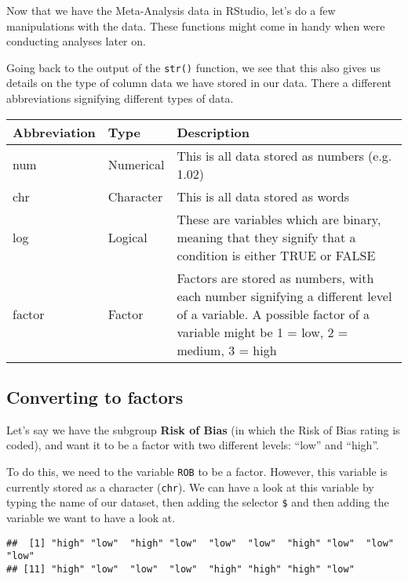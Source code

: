 \documentclass[]{book}
\newenvironment{Shaded}{\begin{snugshade}}{\end{snugshade}}
\newcommand{\OperatorTok}[1]{\textcolor[rgb]{0.81,0.36,0.00}{\textbf{#1}}}
\newcommand{\NormalTok}[1]{#1}
\theoremstyle{definition}
\theoremstyle{definition}
\theoremstyle{definition}
\theoremstyle{remark}
\begin{document}
Now that we have the Meta-Analysis data in RStudio, let's do a few
manipulations with the data. These functions might come in handy when
were conducting analyses later on.

Going back to the output of the \texttt{str()} function, we see that
this also gives us details on the type of column data we have stored in
our data. There a different abbreviations signifying different types of
data.

\begin{tabular}{l|l|l}
\hline
Abbreviation & Type & Description\\
\hline
num & Numerical & This is all data stored as numbers (e.g. 1.02)\\
\hline
chr & Character & This is all data stored as words\\
\hline
log & Logical & These are variables which are binary, meaning that they signify that a condition is either TRUE or FALSE\\
\hline
factor & Factor & Factors are stored as numbers, with each number signifying a different level of a variable. A possible factor of a variable might be 1 = low, 2 = medium, 3 = high\\
\hline
\end{tabular}

\subsection{Converting to factors}\label{converting-to-factors}

Let's say we have the subgroup \textbf{Risk of Bias} (in which the Risk
of Bias rating is coded), and want it to be a factor with two different
levels: ``low'' and ``high''.

To do this, we need to the variable \texttt{ROB} to be a factor.
However, this variable is currently stored as a character
(\texttt{chr}). We can have a look at this variable by typing the name
of our dataset, then adding the selector \texttt{\$} and then adding the
variable we want to have a look at.

\begin{Shaded}
\end{Shaded}

\begin{verbatim}
##  [1] "high" "low"  "high" "low"  "low"  "low"  "high" "low"  "low"  "low" 
## [11] "high" "low"  "low"  "low"  "high" "high" "high" "low"
\end{verbatim}
\end{document}
